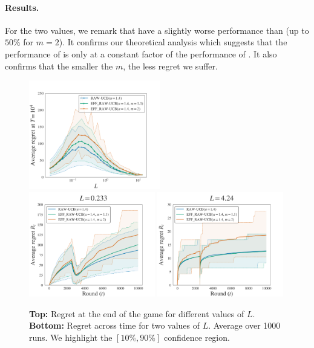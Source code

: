 \paragraph{Results.} For the two values, we remark that \EFFRAW have a slightly worse performance than \RAWUCB (up to $50\%$ for $m=2$). It confirms our theoretical analysis which suggests that the performance of \EFFRAW is only at a constant factor of the performance of \RAWUCB. It also confirms that the smaller the $m$, the less regret we suffer. 
\begin{figure}[!ht]
\centering
\includegraphics[clip, width= 0.51\textwidth]{3Rested/fig/fig1A_eff.pdf}
\includegraphics[clip, width= 0.49\textwidth]{3Rested/fig/fig1B_eff.pdf}
\includegraphics[clip, width= 0.49\textwidth]{3Rested/fig/fig1C_eff.pdf}
\caption{\textbf{Top:} Regret at the end of the game for different values of $L$. \textbf{Bottom:} Regret across time for two values of $L$. Average over 1000 runs. We highlight the $\left[10\%, 90\%\right]$ confidence region.}
\label{fig:rested-eff1}
\end{figure}


